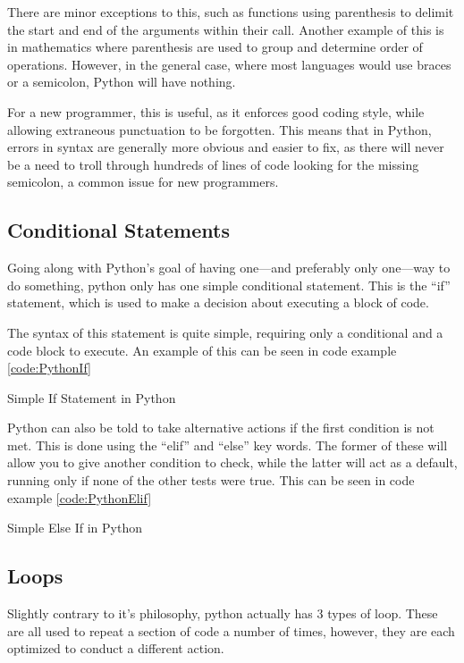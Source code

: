 			There are minor exceptions to this, such as functions using parenthesis to delimit the start and end of the arguments within their call.
			Another example of this is in mathematics where parenthesis are used to group and determine order of operations.
			However, in the general case, where most languages would use braces or a semicolon, Python will have nothing.

			For a new programmer, this is useful, as it enforces good coding style, while allowing extraneous punctuation to be forgotten.
			This means that in Python, errors in syntax are generally more obvious and easier to fix, as there will never be a need to troll through hundreds of lines of code looking for the missing semicolon, a common issue for new programmers.
		\subsection{Conditional Statements}
			Going along with Python's goal of having one---and preferably only one---way to do something, python only has one simple conditional statement.
			This is the ``if'' statement, which is used to make a decision about executing a block of code.

			The syntax of this statement is quite simple, requiring only a conditional and a code block to execute.
			An example of this can be seen in code example \ref{code:PythonIf}
			\begin{code}
				\caption{Simple If Statement in Python}
				\label{code:PythonIf}
			\end{code}

			Python can also be told to take alternative actions if the first condition is not met.
			This is done using the ``elif'' and ``else'' key words.
			The former of these will allow you to give another condition to check, while the latter will act as a default, running only if none of the other tests were true.
			This can be seen in code example \ref{code:PythonElif}
			\begin{code}
				\pcode{./PythonElif.py}
				\caption{Simple Else If in Python}
				\label{code:PythonElif}
			\end{code}
		\subsection{Loops}
			Slightly contrary to it's philosophy, python actually has 3 types of loop.
			These are all used to repeat a section of code a number of times, however, they are each optimized to conduct a different action.


